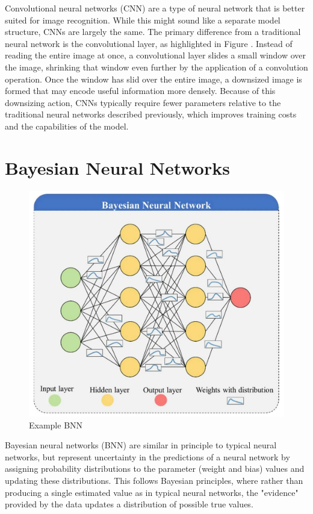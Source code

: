 \documentclass[12pt]{article}
\begin{document}
Convolutional neural networks (CNN) are a type of neural network that is better suited for image recognition. While this might sound like a separate model structure, CNNs are largely the same. The primary difference from a traditional neural network is the convolutional layer, as highlighted in Figure \cite{fig:cnn-pipeline}. Instead of reading the entire image at once, a convolutional layer slides a small window over the image, shrinking that window even further by the application of a convolution operation. Once the window has slid over the entire image, a downsized image is formed that may encode useful information more densely. Because of this downsizing action, CNNs typically require fewer parameters relative to the traditional neural networks described previously, which improves training costs and the capabilities of the model. 




\section{Bayesian Neural Networks}

\begin{figure}[H]
	\centering
	\includegraphics[width=.55\textwidth]{../Images/example_bnn.png}
	\caption{Example BNN  \cite{FleszarBNN}}
\end{figure}

Bayesian neural networks (BNN) are similar in principle to typical neural networks, but represent uncertainty in the predictions of a neural network by assigning probability distributions to the parameter (weight and bias) values and updating these distributions. This follows Bayesian principles, where rather than producing a single estimated value as in typical neural networks, the "evidence" provided by the data updates a distribution of possible true values. 
\end{document}
